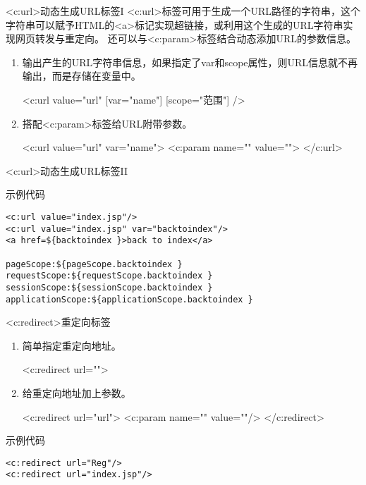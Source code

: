 \documentclass{beamer}
\begin{document}
\begin{frame}{<c:url>动态生成URL标签I}
<c:url>标签可用于生成一个URL路径的字符串，这个字符串可以赋予HTML的<a>标记实现超链接，或利用这个生成的URL字符串实现网页转发与重定向。
还可以与<c:param>标签结合动态添加URL的参数信息。
\begin{enumerate}
\item
输出产生的URL字符串信息，如果指定了var和scope属性，则URL信息就不再输出，而是存储在变量中。

<c:url value="url" [var="name"] [scope="范围"] />


\item 
搭配<c:param>标签给URL附带参数。

<c:url value="url" var="name"> <c:param name="" value=""> </c:url>

\end{enumerate}
\end{frame}
\begin{frame}[fragile]{<c:url>动态生成URL标签II}
\begin{block}{示例代码}
\begin{lstlisting}
<c:url value="index.jsp"/>
<c:url value="index.jsp" var="backtoindex"/>
<a href=${backtoindex }>back to index</a>

pageScope:${pageScope.backtoindex }
requestScope:${requestScope.backtoindex }
sessionScope:${sessionScope.backtoindex }
applicationScope:${applicationScope.backtoindex }
\end{lstlisting}
\end{block}
\end{frame}

\begin{frame}[fragile]{<c:redirect>重定向标签}
\begin{enumerate}
\item
简单指定重定向地址。

<c:redirect url="">
\item
给重定向地址加上参数。

<c:redirect url="url"> <c:param name="" value=""/> </c:redirect>
\end{enumerate}
\begin{block}{示例代码}
\begin{lstlisting}
<c:redirect url="Reg"/>
<c:redirect url="index.jsp"/>
\end{lstlisting}
\end{block}
\end{frame}
\end{document}

